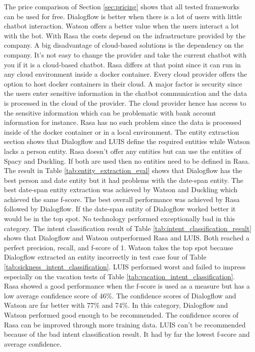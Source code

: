 The price comparison of Section \ref{sec:pricing} shows that all 
tested frameworks can be used for free.
Dialogflow is better when there is a lot of users with little chatbot interaction.
Watson offers a better value when the users interact a lot with the bot.
With Rasa the costs depend on the infrastructure provided by the company.
A big disadvantage of cloud-based solutions is the dependency on the company.
It's not easy to change the provider and take the current chatbot with you if it 
is a cloud-based chatbot. 
Rasa differs at that point since it can run in any cloud environment inside a docker container.
Every cloud provider offers the option to host docker containers in their cloud.
A major factor is security since the users enter sensitive information in the chatbot communication
and the data is processed in the cloud of the provider.
The cloud provider hence has access to the sensitive information which can be problematic with
bank account information for instance.
Rasa has no such problem since the data is processed inside of the docker container or in a 
local environment.
The entity extraction section shows that Dialogflow and LUIS 
define the required entities while Watson lacks a person entity.
Rasa doesn't offer any entities but can use the entities of 
Spacy and Duckling.
If both are used then no entities need to be defined in Rasa.
The result in Table \ref{tab:entity_extraction_eval} shows that 
Dialogflow has the best person and date entity but it 
had problems with the date-span entity.
The best date-span entity extraction was achieved by Watson and Duckling which
achieved the same f-score.
The best overall performance was achieved by Rasa followed by Dialogflow.
If the date-span entity of Dialogflow worked better it would be in the top spot.
No technology performed exceptionally bad in this category.
The intent classification result of Table \ref{tab:intent_classification_result}
shows that Dialogflow and Watson outperformed Rasa and LUIS.
Both reached a perfect precision, recall, and f-score of 1.
Watson takes the top spot because Dialogflow extracted an entity incorrectly 
in test case four of Table \ref{tab:sickness_intent_classification}.
LUIS performed worst and failed to impress especially on the vacation tests
of Table \ref{tab:vacation_intent_classification}.
Rasa showed a good performance when the f-score is used as a measure but 
has a low average confidence score of 46\%.
The confidence scores of Dialogflow and Watson are far better with 77\% and 74\%.
In this category, Dialogflow and Watson performed good enough to be recommended.
The confidence scores of Rasa can be improved through more training data.
LUIS can't be recommended because of the bad intent classification result.
It had by far the lowest f-score and average confidence.


